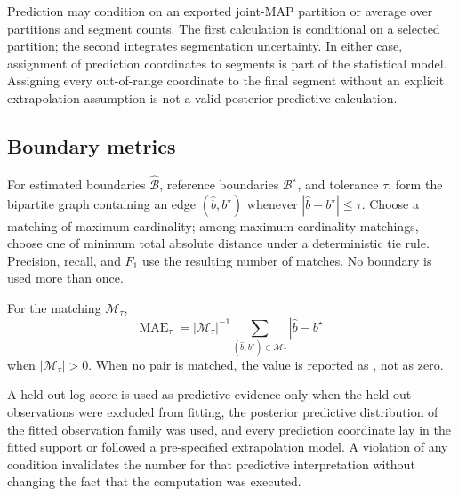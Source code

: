 Prediction may condition on an exported joint-MAP partition or average over partitions and segment counts. The first calculation is conditional on a selected partition; the second integrates segmentation uncertainty. In either case, assignment of prediction coordinates to segments is part of the statistical model. Assigning every out-of-range coordinate to the final segment without an explicit extrapolation assumption is not a valid posterior-predictive calculation.



\subsection{Boundary metrics}
\begin{definition}
\label{def:boundary-matching-paper}
For estimated boundaries $\widehat{\mathcal B}$, reference boundaries $\mathcal B^\star$, and tolerance $\tau$, form the bipartite graph containing an edge $(\widehat b,b^\star)$ whenever $|\widehat b-b^\star|\le\tau$. Choose a matching of maximum cardinality; among maximum-cardinality matchings, choose one of minimum total absolute distance under a deterministic tie rule. Precision, recall, and $F_1$ use the resulting number of matches. No boundary is used more than once.
\end{definition}

\begin{definition}
\label{def:matched-mae-paper}
For the matching $\mathcal M_\tau$,
\[
\operatorname{MAE}_\tau
=|\mathcal M_\tau|^{-1}
 \sum_{(\widehat b,b^\star)\in\mathcal M_\tau}|\widehat b-b^\star|
\]
when $|\mathcal M_\tau|>0$. When no pair is matched, the value is reported as \NA, not as zero.
\end{definition}

\begin{definition}
\label{def:heldout-score-paper}
A held-out log score is used as predictive evidence only when the held-out observations were excluded from fitting, the posterior predictive distribution of the fitted observation family was used, and every prediction coordinate lay in the fitted support or followed a pre-specified extrapolation model. A violation of any condition invalidates the number for that predictive interpretation without changing the fact that the computation was executed.
\end{definition}

